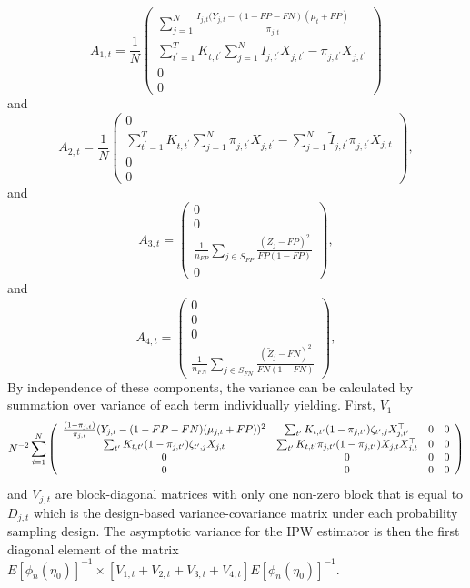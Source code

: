 \documentclass[12pt]{amsart}
\numberwithin{equation}{section}
\theoremstyle{plain}
\begin{document}
$$
A_{1,t} = \frac{1}{N} \left( \begin{array}{c}
\sum_{j=1}^N \frac{I_{j,t} (Y_{j,t} - (1-FP-FN) (\mu_t + FP)}{\pi_{j,t}} \\
\sum_{t^\prime = 1}^T K_{t,t^\prime} \sum_{j=1}^N I_{j,t^\prime} X_{j,t^\prime} - \pi_{j,t^\prime} X_{j,t^\prime} \\
0 \\
0
\end{array}
\right)
$$
and
$$
A_{2,t} = \frac{1}{N} \left( \begin{array}{c}
0 \\
\sum_{t^\prime = 1}^T K_{t,t^\prime} \sum_{j=1}^N \pi_{j,t^\prime} X_{j,t^\prime} - \sum_{j=1}^N \tilde I_{j,t^\prime} \pi_{j,t^\prime} X_{j,t} \\
0 \\
0
\end{array}
\right),
$$
and
$$
A_{3,t} = \left( \begin{array}{c}
0 \\
0 \\
\frac{1}{n_{FP}} \sum_{j \in S_{FP}} \frac{(Z_j-FP)^2}{FP(1-FP)} \\
0
\end{array}
\right),
$$
and
$$
A_{4,t} = \left( \begin{array}{c}
0 \\
0 \\
0 \\
\frac{1}{n_{FN}} \sum_{j \in S_{FN}} \frac{(\tilde Z_j - FN)^2}{FN(1-FN)}
\end{array}
\right),
$$
By independence of these components, the variance can be calculated by summation over variance of each term individually yielding. First, $V_1$
{
\tiny
$$
 N^{-2} \sum_{i=1}^N \left(
\begin{array}{c c c c}
\frac{(1-\pi_{j,t})}{\pi_{j,t}} (Y_{j,t} - (1-FP-FN) (\mu_{j,t} +FP))^2 & \sum_{t^\prime} K_{t,t^\prime} (1-\pi_{j,t^\prime}) \zeta_{t^\prime, j} X_{j,t^\prime}^\top & 0 & 0 \\
\sum_{t^\prime} K_{t,t^\prime} (1-\pi_{j,t^\prime}) \zeta_{t^\prime, j} X_{j,t}&
\sum_{t^\prime} K_{t,t^\prime} \pi_{j,t^\prime} (1-\pi_{j,t^\prime}) X_{j,t} X_{j,t}^\top
& 0 & 0 \\
0 & 0 & 0 & 0 \\
0 & 0 & 0 & 0 \\
\end{array}
\right)
$$
}
and $V_{j,t}$ are block-diagonal matrices with only one non-zero block that is equal to $D_{j,t}$ which is the design-based variance-covariance matrix under each probability sampling design.  The asymptotic variance for the IPW estimator is then the first diagonal element of the matrix $E \left[ \phi_n (\eta_0) \right]^{-1} \times \left[ V_{1,t} + V_{2,t} + V_{3,t} + V_{4,t} \right] E \left[ \phi_n (\eta_0) \right]^{-1}$.
\end{document}
